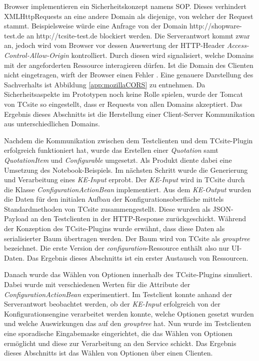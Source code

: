 \documentclass[11pt, a4paper, titlepage, listof=totoc, bibliography=totoc, index=totoc, twoside, openright, headings=normal]{scrreprt}
\begin{document}
Browser implementieren ein Sicherheitskonzept namens \ac{SOP}. Dieses verhindert XMLHttpRequests an eine andere Domain als diejenige, von welcher der Request stammt. Beispielsweise würde eine Anfrage von der Domain \glqq http://shopware-test.de\grqq{} an \glqq http://tcsite-test.de\grqq{} blockiert werden. Die Serverantwort kommt zwar an, jedoch wird vom Browser vor dessen Auswertung der HTTP-Header \emph{Access-Control-Allow-Origin} kontrolliert. Durch diesen wird signalisiert, welche Domains mit der angeforderten Ressource interagieren dürfen. Ist die Domain des Clienten nicht eingetragen, wirft der Browser einen Fehler \citep{mozillaCORS}. Eine genauere Darstellung des Sachverhalts ist Abbildung \ref{app:mozillaCORS} zu entnehmen. Da Sicherheitsaspekte im Prototypen noch keine Rolle spielen, wurde der Tomcat von TCsite so eingestellt, dass er Requests von allen Domains akzeptiert. Das Ergebnis dieses Abschnitts ist die Herstellung einer Client-Server Kommunikation aus unterschiedlichen Domains.

Nachdem die Kommunikation zwischen dem Testclienten und dem TCsite-Plugin erfolgreich funktioniert hat, wurde das Erstellen einer \emph{Quotation} samt \emph{QuotationItem} und \emph{Configurable} umgesetzt. Als Produkt diente dabei eine Umsetzung des Notebook-Beispiels. Im nächsten Schritt wurde die Generierung und Verarbeitung eines \emph{KE-Input} erprobt. Der \emph{KE-Input} wird in TCsite durch die Klasse \emph{ConfigurationActionBean} implementiert. Aus dem \emph{KE-Output} wurden die Daten für den initialen Aufbau der Konfigurationsoberfläche mittels Standardmethoden von TCsite zusammengestellt. Diese wurden als JSON-Payload an den Testclienten in der HTTP-Response zurückgeschickt. Während der Konzeption des TCsite-Plugins wurde erwähnt, dass diese Daten als serialisierter Baum übertragen werden. Der Baum wird von TCsite als \emph{grouptree} bezeichnet. Die erste Version der \emph{configuration}-Ressource enthält also nur UI-Daten. Das Ergebnis dieses Abschnitts ist ein erster Austausch von Ressourcen.

Danach wurde das Wählen von Optionen innerhalb des TCsite-Plugins simuliert. Dabei wurde mit verschiedenen Werten für die Attribute der \emph{ConfigurationActionBean} experimentiert. Im Testclient konnte anhand der Serverantwort beobachtet werden, ob der \emph{KE-Input} erfolgreich von der Konfigurationsengine verarbeitet werden konnte, welche Optionen gesetzt wurden und welche Auswirkungen das auf den \emph{grouptree} hat. Nun wurde im Testclienten eine sporadische Eingabemaske eingerichtet, die das Wählen von Optionen ermöglicht und diese zur Verarbeitung an den Service schickt. Das Ergebnis dieses Abschnitts ist das Wählen von Optionen über einen Clienten.
\end{document}
